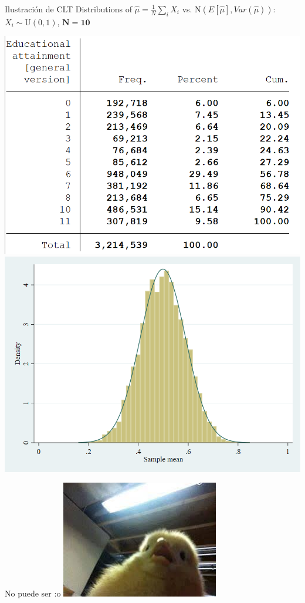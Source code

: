 \documentclass[11pt,handout,aspectratio=169]{beamer}
\begin{document}
\begin{frame}{Ilustración de CLT}
	\vspace{0.2cm}
	Distributions of $\hat{\mu}=\frac{1}{N}\sum_i X_i$ vs. $\mathrm{N}(E[\hat\mu],Var(\hat{\mu}))$: $X_i\sim \mathrm{U}(0,1)$, $\mathbf{N=10}$
	
	\begin{center}
		\includegraphics[scale=0.4]{Stata4.png} \includegraphics[scale=0.25]{sims10.png}
	\end{center}
	
\end{frame}


\begin{frame}{No puede ser :o }
	\centering
	\includegraphics[width = 0.5\linewidth]{surprise.jpg}
\end{frame}
\end{document}
